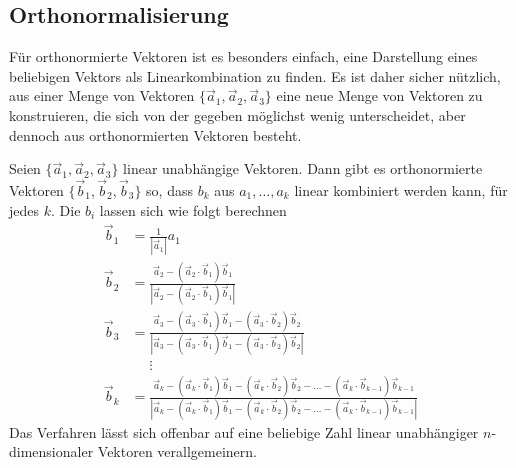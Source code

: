 \subsection{Orthonormalisierung}
Für orthonormierte Vektoren ist es besonders einfach, eine Darstellung
eines beliebigen Vektors als Linearkombination zu finden.
Es ist daher sicher nützlich, aus einer Menge von Vektoren
$\{\vec a_1,\vec a_2,\vec a_3\}$
eine neue Menge von Vektoren zu konstruieren, die sich von der gegeben
möglichst wenig
unterscheidet, aber dennoch aus orthonormierten Vektoren besteht.

\begin{satz}
\label{satz-gram-schmidt}
Seien $\{\vec a_1,\vec a_2,\vec a_3\}$ linear unabhängige Vektoren.
Dann gibt es orthonormierte Vektoren $\{\vec b_1,\vec b_2,\vec b_3\}$ so,
dass $b_k$ aus $a_1,\dots,a_k$ linear kombiniert werden kann, für jedes $k$.
Die $b_i$ lassen sich wie folgt berechnen
\begin{align*}
\vec b_1&=\frac1{|\vec a_1|}a_1\\
\vec b_2&=
\frac{
\vec a_2-(\vec a_2\cdot \vec b_1)\vec b_1
}{
|\vec a_2-(\vec a_2\cdot \vec b_1)\vec b_1|
}
\\
\vec b_3
&=
\frac{
\vec a_3-(\vec a_3\cdot \vec b_1)\vec b_1-(\vec a_3\cdot\vec b_2)\vec b_2
}{
|
\vec a_3-(\vec a_3\cdot \vec b_1)\vec b_1-(\vec a_3\cdot\vec b_2)\vec b_2
|
}
\\
&\phantom{=}\vdots\\
\vec b_k&=\frac{\vec a_k-(\vec a_k\cdot \vec b_1)\vec b_1-(\vec a_k\cdot \vec b_2)\vec b_2-\dots-(\vec a_k\cdot \vec b_{k-1})\vec b_{k-1}}{|\vec a_k-(\vec a_k\cdot \vec b_1)\vec b_1-(\vec a_k\cdot \vec b_2)\vec b_2-\dots-(\vec a_k\cdot \vec b_{k-1})\vec b_{k-1}|}
\end{align*}
Das Verfahren lässt sich offenbar auf eine beliebige Zahl linear
unabhängiger $n$-dimensionaler Vektoren verallgemeinern.
\end{satz}

